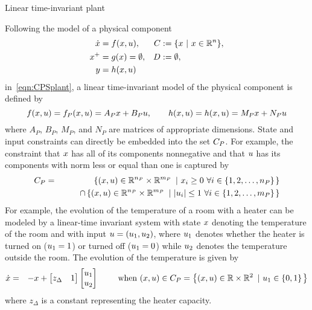 \begin{example}{Linear time-invariant plant}
\label{ex:LTIplant}

Following the model of a physical component 
\IfSAE
{
\begin{subequations}\label{eqn:CPSplant}
\begin{align}
\dot{x} &= f(x,u), 
&C &:= \{ x\ |\ x \in {\mathbb R}^{n}\},\\
x^+ &= g(x) =\emptyset,
&D &:= \emptyset,\\
y &= h(x,u)
\end{align}
\end{subequations}
}
{
in~\eqref{eqn:CPSplant},
} 
a linear time-invariant model of the physical component is defined by
$$
f(x,u) = f_P(x,u)= A_P x + B_P u, \qquad h(x,u) = h(x,u) = M_P x + N_P u
$$
where $A_P$, $B_P$, $M_P$, and $N_P$ are matrices of appropriate dimensions. 
State and input constraints can directly be embedded into the set $C_P$. 
For example, the constraint that $x$ has all of its components 
nonnegative and that $u$ has its components with norm
less or equal than one is captured by 
\begin{eqnarray*}
C_P &=& \left\{(x,u)\in{\mathbb R}^{n_P}\times {\mathbb R}^{m_P}\ \left| \ x_i \geq 0 \ \forall i \in \{1,2,\ldots,n_P\} \right.\right\} 
\\ & & \qquad \cap \left\{(x,u)\in{\mathbb R}^{n_P}\times {\mathbb R}^{m_P}\ \left| \ |u_i| \leq 1 \  \forall i \in \{1,2,\ldots,m_P\} \right.\right\}
\end{eqnarray*}
For example, the evolution of the temperature of a room with a heater
can be modeled by a linear-time invariant system 
with state $x$ denoting the temperature of the room
and with input $u = (u_1,u_2)$, where 
$u_1$ denotes whether the heater is turned on ($u_1 = 1$) or
turned off ($u_1 = 0$) while $u_2$ denotes the temperature
outside the room.
The evolution of the temperature is given by
\begin{eqnarray}\label{eqn:TemperatureModel}
\xpdot & = & -\xp + \matt{z_\Delta & 1} \matt{\up_1 \\ \up_2} \qquad \mbox{ when } (\xp,\up)\in \Cp= \defset{(\xp,\up) \in \reals\times\reals^2}{\up_1 \in \{0,1\}}
\end{eqnarray}
where $z_\Delta$ is a constant representing the heater capacity.
\end{example}
